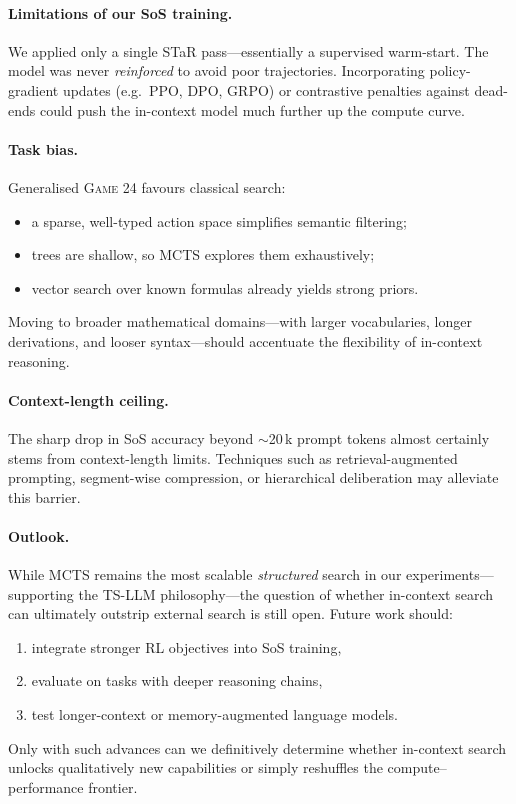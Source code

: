 \documentclass{article}
\begin{document}
\paragraph{Limitations of our SoS training.}
We applied only a single STaR pass—essentially a supervised warm-start.
The model was never \emph{reinforced} to avoid poor trajectories.
Incorporating policy-gradient updates (e.g.\ PPO, DPO, GRPO) or
contrastive penalties against dead-ends could push the in-context model
much further up the compute curve.

\paragraph{Task bias.}
Generalised \textsc{Game 24} favours classical search:
\begin{itemize}
\item a sparse, well-typed action space simplifies semantic filtering;
\item trees are shallow, so MCTS explores them exhaustively;
\item vector search over known formulas already yields strong priors.
\end{itemize}
Moving to broader mathematical domains—with larger vocabularies,
longer derivations, and looser syntax—should accentuate the
flexibility of in-context reasoning.

\paragraph{Context-length ceiling.}
The sharp drop in SoS accuracy beyond $\sim$20\,k prompt tokens almost
certainly stems from context-length limits.
Techniques such as retrieval-augmented prompting, segment-wise
compression, or hierarchical deliberation may alleviate this barrier.

\paragraph{Outlook.}
While MCTS remains the most scalable \emph{structured} search in our
experiments—supporting the TS-LLM philosophy—the question of whether
in-context search can ultimately outstrip external search is still open.
Future work should:
\begin{enumerate}
\item integrate stronger RL objectives into SoS training,
\item evaluate on tasks with deeper reasoning chains,
\item test longer-context or memory-augmented language models.
\end{enumerate}
Only with such advances can we definitively determine whether
in-context search unlocks qualitatively new capabilities or simply
reshuffles the compute–performance frontier.
\end{document}
